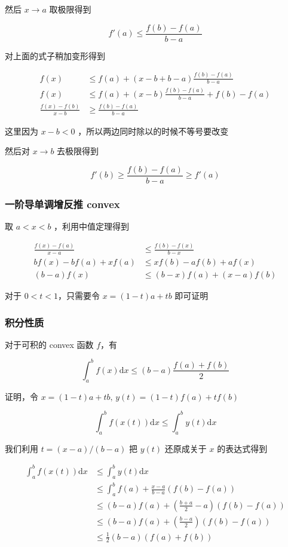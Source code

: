 \documentclass[12pt,a4paper]{ctexart}
\begin{document}
然后 $x \to a$ 取极限得到

\[
f'(a) \le \frac{f(b) - f(a)}{b-a}
\]

对上面的式子稍加变形得到

\begin{align*}
    f(x) &\le f(a) + (x-b + b - a)\frac{f(b) - f(a)}{b-a} \\
    f(x) & \le f(a) + (x-b)\frac{f(b) - f(a)}{b-a} + f(b) - f(a) \\
    \frac{f(x) - f(b)}{x-b} &\ge \frac{f(b) - f(a)}{b-a} 
\end{align*}

这里因为 $x-b < 0$ ，所以两边同时除以的时候不等号要改变

然后对 $x \to b$ 去极限得到

\[
f'(b) \ge \frac{f(b) - f(a)}{b-a} \ge f'(a)
\]

\subsubsection{一阶导单调增反推 convex}

取 $a < x < b$ ，利用中值定理得到

\begin{align*}
\frac{f(x) - f(a)}{x-a} &\le \frac{f(b) - f(x)}{b-x} \\
bf(x) - bf(a) + xf(a) &\le xf(b) -af(b) + af(x)  \\
(b-a)f(x) & \le (b-x)f(a) + (x-a)f(b)
\end{align*}

对于 $0 < t < 1$，只需要令 $x = (1-t)a + tb$ 即可证明

\subsubsection{积分性质}

对于可积的 convex 函数 $f$，有

\[
\int_{a}^{b} f(x) \text{d} x  \le (b-a)\frac{f(a) + f(b)}{2}
\]

证明，令 $x=(1-t)a + tb,\, y(t) = (1-t)f(a) + tf(b)$

\[
\int_{a}^{b} f(x(t)) \text{d} x \le  \int_{a}^{b}y(t) \text{d} x
\]

我们利用 $t = (x-a)/(b-a)$ 把 $y(t)$ 还原成关于 $x$ 的表达式得到

\begin{align*}
\int_{a}^{b} f(x(t)) \text{d} x &\le  \int_{a}^{b}y(t) \text{d} x \\
& \le \int_{a}^{b}f(a)+ \frac{x-a}{b-a}(f(b) - f(a)) \\
& \le (b-a)f(a) + (\frac{b+a}{2}-a)(f(b) - f(a)) \\
& \le (b-a)f(a) + (\frac{b-a}{2})(f(b) - f(a)) \\
& \le \frac{1}{2}(b-a)\left( f(a) + f(b) \right)
\end{align*}
\end{document}
